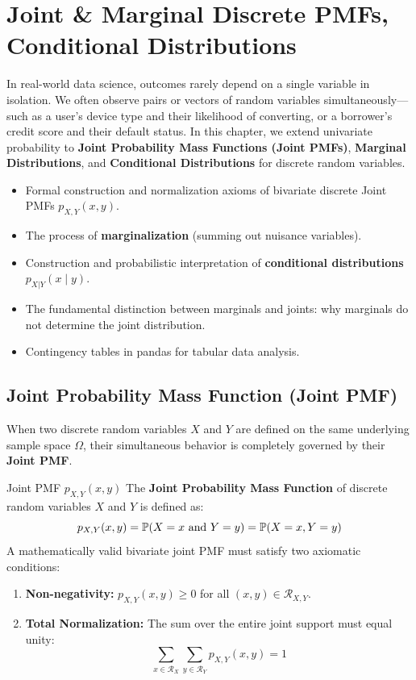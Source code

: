 \chapter{Joint \& Marginal Discrete PMFs, Conditional Distributions}

In real-world data science, outcomes rarely depend on a single variable in isolation. We often observe pairs or vectors of random variables simultaneously---such as a user's device type and their likelihood of converting, or a borrower's credit score and their default status. In this chapter, we extend univariate probability to \textbf{Joint Probability Mass Functions (Joint PMFs)}, \textbf{Marginal Distributions}, and \textbf{Conditional Distributions} for discrete random variables.

\vspace{0.5cm}
\begin{tcolorbox}[colback=primarylight, colframe=primarydark, title={\textbf{What You'll Learn in this Chapter}}]
\begin{itemize}
    \item Formal construction and normalization axioms of bivariate discrete Joint PMFs $p_{X,Y}(x, y)$.
    \item The process of \textbf{marginalization} (summing out nuisance variables).
    \item Construction and probabilistic interpretation of \textbf{conditional distributions} $p_{X|Y}(x \mid y)$.
    \item The fundamental distinction between marginals and joints: why marginals do not determine the joint distribution.
    \item Contingency tables in pandas for tabular data analysis.
\end{itemize}
\end{tcolorbox}

\section{Joint Probability Mass Function (Joint PMF)}

When two discrete random variables $X$ and $Y$ are defined on the same underlying sample space $\Omega$, their simultaneous behavior is completely governed by their \textbf{Joint PMF}.

\begin{definitionbox}{Joint PMF $p_{X,Y}(x, y)$}
The \textbf{Joint Probability Mass Function} of discrete random variables $X$ and $Y$ is defined as:
$$p_{X,Y}(x, y) = \P(X = x \text{ and } Y = y) = \P(X = x, Y = y)$$
A mathematically valid bivariate joint PMF must satisfy two axiomatic conditions:
\begin{enumerate}
    \item \textbf{Non-negativity:} $p_{X,Y}(x, y) \ge 0$ for all $(x, y) \in \mathcal{R}_{X,Y}$.
    \item \textbf{Total Normalization:} The sum over the entire joint support must equal unity:
    $$\sum_{x \in \mathcal{R}_X} \sum_{y \in \mathcal{R}_Y} p_{X,Y}(x, y) = 1$$
\end{enumerate}
\end{definitionbox}

